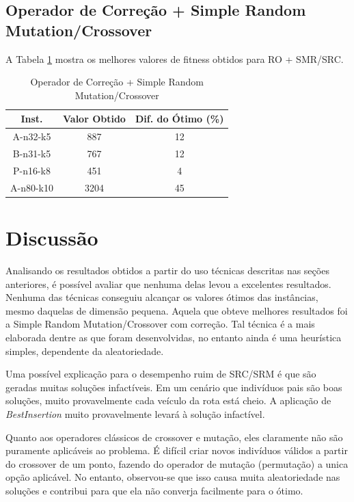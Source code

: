 \documentclass[conference]{IEEEtran}
\begin{document}
\subsection{Operador de Correção + Simple Random Mutation/Crossover}
A Tabela \ref{table_correction} mostra os melhores valores de fitness obtidos para RO + SMR/SRC.

\begin{table}[!t]
\renewcommand{\arraystretch}{1.3}
\centering
\caption{Operador de Correção + Simple Random Mutation/Crossover}
\label{table_correction}
\begin{tabular}{|c||c||c|}
\hline
Inst. & Valor Obtido & Dif. do Ótimo (\%)\\
\hline
A-n32-k5 & 887 & 12\\
B-n31-k5 & 767 & 12\\
P-n16-k8 & 451 & 4\\
A-n80-k10 & 3204 & 45\\
\hline
\end{tabular}
\end{table}

\section{Discussão}
Analisando os resultados obtidos a partir do uso técnicas descritas nas seções anteriores, é possível avaliar que nenhuma delas levou a excelentes resultados. Nenhuma das técnicas conseguiu alcançar os valores ótimos das instâncias, mesmo daquelas de dimensão pequena.
Aquela que obteve melhores resultados foi a Simple Random Mutation/Crossover com correção. Tal técnica é a mais elaborada dentre as que foram desenvolvidas, no entanto ainda é uma heurística simples, dependente da aleatoriedade. 

Uma possível explicação para o desempenho ruim de SRC/SRM é que são geradas muitas soluções infactíveis. Em um cenário que indivíduos pais são boas soluções, muito provavelmente cada veículo da rota está cheio. A aplicação de \textit{BestInsertion} muito provavelmente levará à solução infactível. 

Quanto aos operadores clássicos de crossover e mutação, eles claramente não são puramente aplicáveis ao problema. É difícil criar novos indivíduos válidos a partir do crossover de um ponto, fazendo do operador de mutação (permutação) a unica opção aplicável. No entanto, observou-se que isso causa muita aleatoriedade nas soluções e contribui para que ela não converja facilmente para o ótimo.
\end{document}
